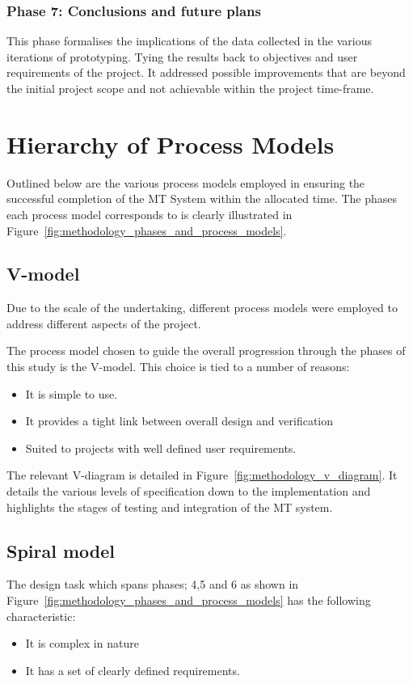 \subsubsection{Phase 7: Conclusions and future plans}
This phase formalises the implications of the data collected in the various
iterations of prototyping. Tying the results back to objectives and user
requirements of the project.
It addressed possible improvements that are beyond the initial project scope
and not achievable within the project time-frame.

\section{Hierarchy of Process Models}
Outlined below are the various process models employed in ensuring the
successful completion of the MT System within the allocated time. The phases
each process model corresponds to is clearly illustrated in
Figure~\ref{fig:methodology_phases_and_process_models}. 

\subsection{V-model}
Due to the scale of the undertaking, different process models were employed to
address different aspects of the project.

The process model chosen to guide the overall progression through the phases of
this study is the V-model. This choice is tied to a number of reasons: 
\begin{itemize}
    \item It is simple to use.
    \item It provides a tight link between overall design and verification 
    \item Suited to projects with well defined user requirements.
\end{itemize}

The relevant V-diagram is detailed in Figure~\ref{fig:methodology_v_diagram}. It
details the various levels of specification down to the implementation and
highlights the stages of testing and integration of the MT system.


\subsection{Spiral model}
The design task which spans phases; 4,5 and 6 as shown in
Figure~\ref{fig:methodology_phases_and_process_models} has the following
characteristic: 
\begin{itemize}
    \item It is complex in nature
    \item It has a set of clearly defined requirements. 
\end{itemize}

